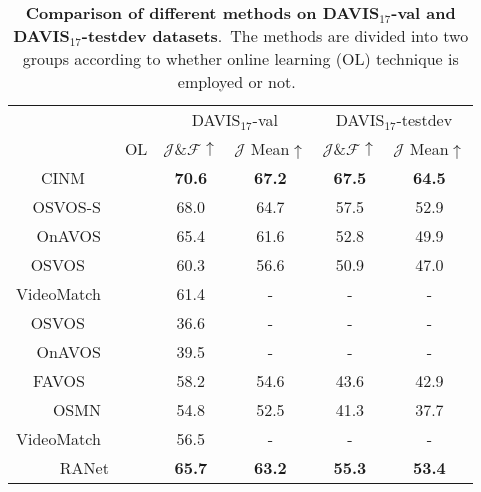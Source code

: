 \documentclass[10pt,twocolumn,letterpaper]{article}
\newcommand{\cmark}{\ding{51}}\newcommand{\xmark}{\ding{55}}\usepackage{booktabs}
\begin{document}
\begin{table}[t]
\vspace{-2mm}
\centering
\scriptsize
\begin{tabular}{r||c|cc|cc}
\Xhline{1pt}
\rowcolor[rgb]{ .873,  .91,  0.95}
&
& 
\multicolumn{2}{c|}{DAVIS$_{17}$-val} 
& 
\multicolumn{2}{c}{DAVIS$_{17}$-testdev} 
\\
\rowcolor[rgb]{ .873,  .91,  0.95}
\multicolumn{1}{c||}{\multirow{-2}{*}{Method}}
& 
\multirow{-2}{*}{OL}
& $\mathcal{J}$\&$\mathcal{F}\uparrow$  & $\mathcal{J}$ Mean$\uparrow$  & $\mathcal{J}$\&$\mathcal{F}\uparrow$  & $\mathcal{J}$ Mean$\uparrow $
\\
\hline
\hline
CINM\ \ ~\cite{cinm} & \cmark &
\textbf{70.6} & \textbf{67.2} & \textbf{67.5} & \textbf{64.5} 
\\
\rowcolor[rgb]{ .94,  .94,  .94}
OSVOS-S~\cite{osvos-s} & \cmark &
68.0 & 64.7 & 57.5 & 52.9 
\\
OnAVOS~\cite{onavos} & \cmark & 
65.4 & 61.6 & 52.8 & 49.9 
\\
\rowcolor[rgb]{ .94,  .94,  .94}
OSVOS\ \ ~\cite{osvos} & \cmark & 
60.3 & 56.6 & 50.9 & 47.0 
\\
VideoMatch~\cite{videomatch} & \cmark & 
61.4 & -    & -    & - 
\\
\hline
\hline
\rowcolor[rgb]{ .94,  .94,  .94}
OSVOS\ \ ~\cite{osvos} & \xmark & 
36.6 & -    & -    & - 
\\
OnAVOS~\cite{onavos} & \xmark & 
39.5 & -    & -    & - 
\\
\rowcolor[rgb]{ .94,  .94,  .94}
FAVOS\ \ ~\cite{favos} & \xmark & 
58.2 & 54.6 & 43.6 & 42.9 
\\
OSMN~\cite{osvos-s} & \xmark & 
54.8 & 52.5 & 41.3 & 37.7 \\
\rowcolor[rgb]{ .94,  .94,  .94}
VideoMatch~\cite{videomatch} & \xmark & 
56.5 & -    & -    & - 
\\
\hline
RANet & \xmark &
\textbf{65.7} & \textbf{63.2} & \textbf{55.3} & \textbf{53.4}
\\
\hline
\end{tabular}\vspace{-3mm}
\caption{\textbf{Comparison of different methods on DAVIS$_{17}$-val and DAVIS$_{17}$-testdev datasets}.\ The methods are divided into two groups according to whether online learning (OL) technique is employed or not.\ }
\label{tab:17val}\vspace{-4mm}
\end{table}
\end{document}
